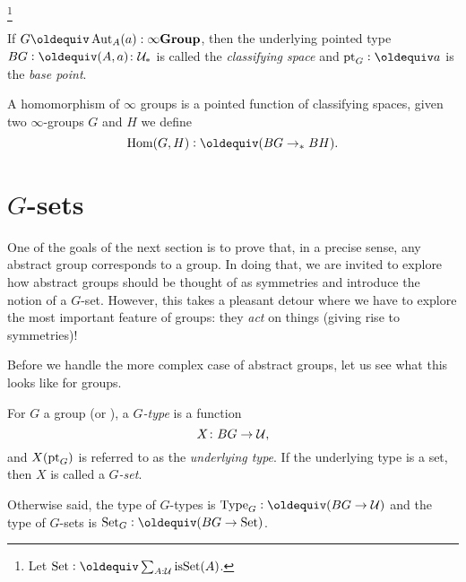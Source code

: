 \footnote{Let $\typeset\defequi \sum_{A:\UU}\isset(A)$.}
\begin{definition}\label{def:classifyingspace}
  If $G\oldequiv\Aut_A(a):\typeinftygp$, then the underlying pointed type $BG\defequi (A,a)\colon\pttype$ is called the  \emph{classifying space} and $\pt_G\defequi a$ is the \emph{base point}.  
\end{definition}
\begin{definition}
  A homomorphism of $\infty$ groups is a pointed function of classifying spaces, \ie
  given two $\infty$-groups $G$ and $H$ we define
$$\Hom(G,H)\defequi(BG\to_*BH).$$
\end{definition}





\section{$G$-sets}
\label{sec:gsets}

One of the goals of the next section is to prove that, in a precise sense, any abstract group corresponds to a group.  In doing that, we are invited to explore how abstract groups should be thought of as symmetries and introduce the notion of a $G$-set.  However, this takes a pleasant detour where we have to explore the most important feature of groups: they \emph{act} on things (giving rise to symmetries)!

Before we handle the more complex case of abstract groups, let us see what this looks like for groups.

\begin{definition}
  For $G$ a group (or \inftygp), a \emph{$G$-type} is a function
  $$X\colon BG\to\mathcal{U},$$
and $X({\mathord{\mathrm{pt}}}_G)$ is referred to as the \emph{underlying type}.
If the underlying type is a set, then $X$ is called a \emph{$G$-set}.

Otherwise said, the type of $G$-types is $\Type_G\defequi(BG\to\UU)$ and the type of $G$-sets is $\Set_G\defequi(BG\to\Set)$.
\end{definition}

